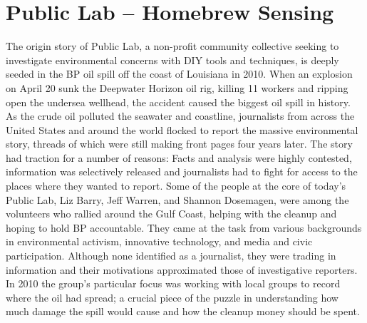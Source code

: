 \section{Public Lab – Homebrew Sensing}
The origin story of Public Lab, a non-profit community collective seeking
to investigate environmental concerns with DIY tools and techniques, is
deeply seeded in the BP oil spill off the coast of Louisiana in 2010. When an
explosion on April 20 sunk the Deepwater Horizon oil rig, killing 11 workers
and ripping open the undersea wellhead, the accident caused the biggest
oil spill in history. As the crude oil polluted the seawater and coastline, journalists
from across the United States and around the world flocked to report
the massive environmental story, threads of which were still making front
pages four years later. The story had traction for a number of reasons: Facts
and analysis were highly contested, information was selectively released and
journalists had to fight for access to the places where they wanted to report.
Some of the people at the core of today's Public Lab, Liz Barry, Jeff Warren,
and Shannon Dosemagen, were among the volunteers who rallied around
the Gulf Coast, helping with the cleanup and hoping to hold BP accountable.
They came at the task from various backgrounds in environmental activism,
innovative technology, and media and civic participation. Although none
identified as a journalist, they were trading in information and their motivations
approximated those of investigative reporters. In 2010 the group's
particular focus was working with local groups to record where the oil had
spread; a crucial piece of the puzzle in understanding how much damage
the spill would cause and how the cleanup money should be spent.

